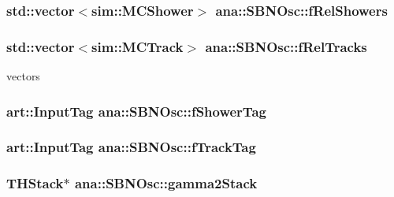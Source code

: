 \hypertarget{namespaceana_1_1SBNOsc_a835384228e9ece629d6af6a74abfadeb}{
\subsubsection[{fRelShowers}]{\setlength{\rightskip}{0pt plus 5cm}std::vector$<$sim::MCShower$>$ {\bf ana::SBNOsc::fRelShowers}}}
\label{namespaceana_1_1SBNOsc_a835384228e9ece629d6af6a74abfadeb}
\hypertarget{namespaceana_1_1SBNOsc_a91abcb43a0813753bf8d88336515df12}{
\subsubsection[{fRelTracks}]{\setlength{\rightskip}{0pt plus 5cm}std::vector$<$sim::MCTrack$>$ {\bf ana::SBNOsc::fRelTracks}}}
\label{namespaceana_1_1SBNOsc_a91abcb43a0813753bf8d88336515df12}
vectors \hypertarget{namespaceana_1_1SBNOsc_add9629697b222d44721995afd2fa694d}{
\subsubsection[{fShowerTag}]{\setlength{\rightskip}{0pt plus 5cm}art::InputTag {\bf ana::SBNOsc::fShowerTag}}}
\label{namespaceana_1_1SBNOsc_add9629697b222d44721995afd2fa694d}
\hypertarget{namespaceana_1_1SBNOsc_adabde93df02e88c081f79f1e98052f59}{
\subsubsection[{fTrackTag}]{\setlength{\rightskip}{0pt plus 5cm}art::InputTag {\bf ana::SBNOsc::fTrackTag}}}
\label{namespaceana_1_1SBNOsc_adabde93df02e88c081f79f1e98052f59}
\hypertarget{namespaceana_1_1SBNOsc_a30d63f8aba0987e9f063a67cce396d97}{
\subsubsection[{gamma2Stack}]{\setlength{\rightskip}{0pt plus 5cm}THStack$\ast$ {\bf ana::SBNOsc::gamma2Stack}}}
